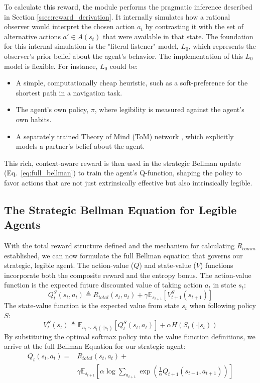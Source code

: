 \documentclass{article}
\begin{document}
To calculate this reward, the module performs the pragmatic inference described in Section \ref{ssec:reward_derivation}. It internally simulates how a rational observer would interpret the chosen action $a_t$ by contrasting it with the set of alternative actions $a' \in A(s_t)$ that were available in that state. The foundation for this internal simulation is the "literal listener" model, $L_0$, which represents the observer's prior belief about the agent's behavior. The implementation of this $L_0$ model is flexible. For instance, $L_0$ could be:
\begin{itemize}
    \item A simple, computationally cheap heuristic, such as a soft-preference for the shortest path in a navigation task.
    \item The agent's own policy, $\pi$, where legibility is measured against the agent's own habits.
    \item A separately trained Theory of Mind (ToM) network \cite{machinetom}, which explicitly models a partner's belief about the agent.
\end{itemize}
This rich, context-aware reward is then used in the strategic Bellman update (Eq.~\ref{eq:full_bellman}) to train the agent's Q-function, shaping the policy to favor actions that are not just extrinsically effective but also intrinsically legible.

\subsection{The Strategic Bellman Equation for Legible Agents}
\label{ssec:bellman}

With the total reward structure defined and the mechanism for calculating $R_{comm}$ established, we can now formulate the full Bellman equation that governs our strategic, legible agent. The action-value ($Q$) and state-value ($V$) functions incorporate both the composite reward and the entropy bonus. The action-value function is the expected future discounted value of taking action $a_t$ in state $s_t$:
\begin{equation}
Q_{t}^{S}(s_{t},a_{t})\triangleq R_{total}(s_{t},a_{t})+\gamma\mathbb{E}_{s_{t+1}}[V_{t+1}^{S}(s_{t+1})]
\end{equation}
The state-value function is the expected value from state $s_t$ when following policy $S$:
\begin{equation}
V_{t}^{S}(s_{t})\triangleq\mathbb{E}_{a_{t}\sim S_{t}(\cdot|s_{t})}[Q_{t}^{S}(s_{t},a_{t})]+\alpha H(S_{t}(\cdot|s_{t}))
\end{equation}
By substituting the optimal softmax policy into the value function definitions, we arrive at the full Bellman Equation for our strategic agent:
\begin{equation}
\label{eq:full_bellman}
\begin{split}
    Q_t(s_t, a_t) ={}& R_{total}(s_t, a_t) + \\
                     & \gamma \mathbb{E}_{s_{t+1}}\left[\alpha \log \sum_{a_{t+1}} \exp\left(\frac{1}{\alpha}Q_{t+1}(s_{t+1}, a_{t+1})\right)\right]
\end{split}
\end{equation}
\end{document}
